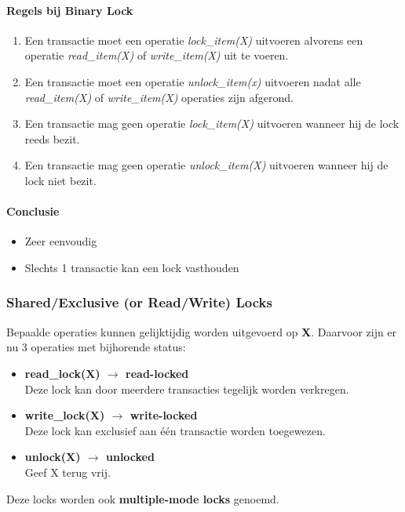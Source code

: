 \paragraph{Regels bij Binary Lock}
\begin{enumerate}
	\item Een transactie moet een operatie \textit{lock\_item(X)} uitvoeren alvorens een operatie \textit{read\_item(X)} of \textit{write\_item(X)} uit te voeren.
	\item Een transactie moet een operatie \textit{unlock\_item(x)} uitvoeren nadat alle \textit{read\_item(X)} of \textit{write\_item(X)} operaties zijn afgerond.
	\item Een transactie mag geen operatie \textit{lock\_item(X)} uitvoeren wanneer hij de lock reeds bezit.
	\item Een transactie mag geen operatie \textit{unlock\_item(X)} uitvoeren wanneer hij de lock niet bezit.
\end{enumerate}

\paragraph{Conclusie}
\begin{itemize}
	\item Zeer eenvoudig
	\item Slechts 1 transactie kan een lock vasthouden
\end{itemize}

 
\subsubsection{Shared/Exclusive (or Read/Write) Locks}
Bepaalde operaties kunnen gelijktijdig worden uitgevoerd op \textbf{X}. Daarvoor zijn er nu 3 operaties met bijhorende status:
\begin{itemize}
	\item \textbf{read\_lock(X) $\rightarrow$ read-locked} \\ Deze lock kan door meerdere transacties tegelijk worden verkregen.
	\item \textbf{write\_lock(X) $\rightarrow$ write-locked} \\ Deze lock kan exclusief aan \'e\'en transactie worden toegewezen.
	\item \textbf{unlock(X) $\rightarrow$ unlocked} \\ Geef X terug vrij.
\end{itemize}
Deze locks worden ook \textbf{multiple-mode locks} genoemd.

